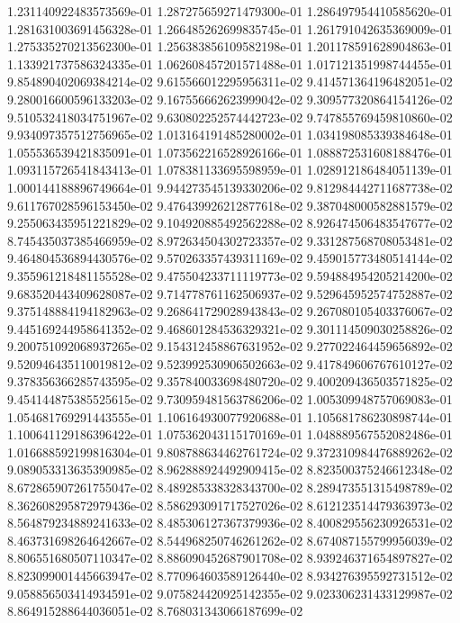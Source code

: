 1.231140922483573569e-01
1.287275659271479300e-01
1.286497954410585620e-01
1.281631003691456328e-01
1.266485262699835745e-01
1.261791042635369009e-01
1.275335270213562300e-01
1.256383856109582198e-01
1.201178591628904863e-01
1.133921737586324335e-01
1.062608457201571488e-01
1.017121351998744455e-01
9.854890402069384214e-02
9.615566012295956311e-02
9.414571364196482051e-02
9.280016600596133203e-02
9.167556662623999042e-02
9.309577320864154126e-02
9.510532418034751967e-02
9.630802252574442723e-02
9.747855769459810860e-02
9.934097357512756965e-02
1.013164191485280002e-01
1.034198085339384648e-01
1.055536539421835091e-01
1.073562216528926166e-01
1.088872531608188476e-01
1.093115726541843413e-01
1.078381133695598959e-01
1.028912186484051139e-01
1.000144188896749664e-01
9.944273545139330206e-02
9.812984442711687738e-02
9.611767028596153450e-02
9.476439926212877618e-02
9.387048000582881579e-02
9.255063435951221829e-02
9.104920885492562288e-02
8.926474506483547677e-02
8.745435037385466959e-02
8.972634504302723357e-02
9.331287568708053481e-02
9.464804536894430576e-02
9.570263357439311169e-02
9.459015773480514144e-02
9.355961218481155528e-02
9.475504233711119773e-02
9.594884954205214200e-02
9.683520443409628087e-02
9.714778761162506937e-02
9.529645952574752887e-02
9.375148884194182963e-02
9.268641729028943843e-02
9.267080105403376067e-02
9.445169244958641352e-02
9.468601284536329321e-02
9.301114509030258826e-02
9.200751092068937265e-02
9.154312458867631952e-02
9.277022464459656892e-02
9.520946435110019812e-02
9.523992530906502663e-02
9.417849606767610127e-02
9.378356366285743595e-02
9.357840033698480720e-02
9.400209436503571825e-02
9.454144875385525615e-02
9.730959481563786206e-02
1.005309948757069083e-01
1.054681769291443555e-01
1.106164930077920688e-01
1.105681786230898744e-01
1.100641129186396422e-01
1.075362043115170169e-01
1.048889567552082486e-01
1.016688592199816304e-01
9.808788634462761724e-02
9.372310984476889262e-02
9.089053313635390985e-02
8.962888924492909415e-02
8.823500375246612348e-02
8.672865907261755047e-02
8.489285338328343700e-02
8.289473551315498789e-02
8.362608295872979436e-02
8.586293091717527026e-02
8.612123514479363973e-02
8.564879234889241633e-02
8.485306127367379936e-02
8.400829556230926531e-02
8.463731698264642667e-02
8.544968250746261262e-02
8.674087155799956039e-02
8.806551680507110347e-02
8.886090452687901708e-02
8.939246371654897827e-02
8.823099001445663947e-02
8.770964603589126440e-02
8.934276395592731512e-02
9.058856503414934591e-02
9.075824420925142355e-02
9.023306231433129987e-02
8.864915288644036051e-02
8.768031343066187699e-02
